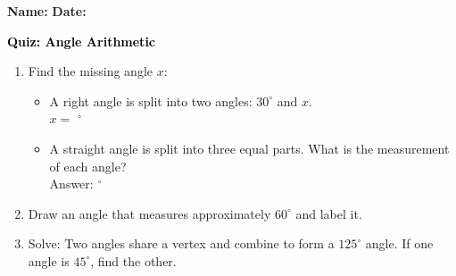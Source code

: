 \documentclass[12pt, letterpaper, fleqn]{article}
\newcommand{\blank}{\underline{\hspace{2.2cm}}}
\begin{document}
\textbf{Name:} \underline{\hspace{5cm}}
\hfill
\textbf{Date:} \underline{\hspace{3cm}}\\

\begin{tcolorbox}[colback=customteal!20]
    \large\textcolor{black}{\textbf{Quiz: Angle Arithmetic}}
\end{tcolorbox}

\vspace{5mm}
\begin{enumerate}[itemsep=3cm, leftmargin=0.6cm]
\item Find the missing angle $x$:
  \begin{itemize}[itemsep=1cm]
    \item A right angle is split into two angles: $30^\circ$ and $x$. \\ $x =$ \blank $^\circ$
    \item A straight angle is split into three equal parts. What is the measurement of each angle? \\ Answer: \blank $^\circ$
  \end{itemize}

\item Draw an angle that measures approximately $60^\circ$ and label it.
\vspace{4cm}

\item Solve: Two angles share a vertex and combine to form a $125^\circ$ angle. If one angle is $45^\circ$, find the other.
\end{enumerate}
\end{document}
